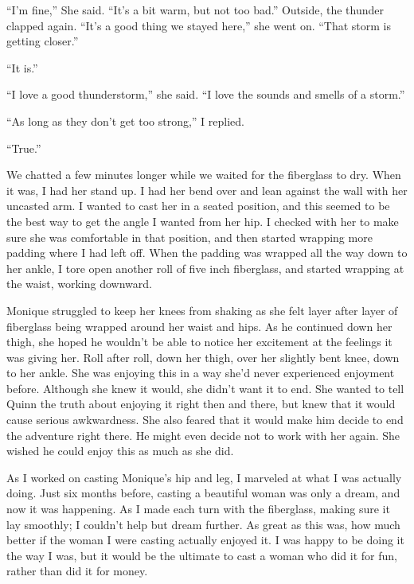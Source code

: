 ``I'm fine,'' She said. ``It's a bit warm, but not too bad.'' Outside, the thunder clapped
again. ``It's a good thing we stayed here,'' she went on. ``That storm is getting closer.''

``It is.''

``I love a good thunderstorm,'' she said. ``I love the sounds and smells of a storm.''

``As long as they don't get too strong,'' I replied.

``True.''

We chatted a few minutes longer while we waited for the fiberglass to dry. When it was, I
had her stand up. I had her bend over and lean against the wall with her uncasted arm. I wanted
to cast her in a seated position, and this seemed to be the best way to get the angle I wanted
from her hip. I checked with her to make sure she was comfortable in that position, and then
started wrapping more padding where I had left off. When the padding was wrapped all the way
down to her ankle, I tore open another roll of five inch fiberglass, and started wrapping at the
waist, working downward.

\begin{thought}
Monique struggled to keep her knees from shaking as she felt layer after layer of
fiberglass being wrapped around her waist and hips. As he continued down her thigh, she hoped he
wouldn't be able to notice her excitement at the feelings it was giving her. Roll after roll,
down her thigh, over her slightly bent knee, down to her ankle. She was enjoying this in a way
she'd never experienced enjoyment before. Although she knew it would, she didn't want it to end.
She wanted to tell Quinn the truth about enjoying it right then and there, but knew that it
would cause serious awkwardness. She also feared that it would make him decide to end the
adventure right there. He might even decide not to work with her again. She wished he could
enjoy this as much as she did.
\end{thought}

As I worked on casting Monique's hip and leg, I marveled at what I was actually doing.
Just six months before, casting a beautiful woman was only a dream, and now it was happening. As
I made each turn with the fiberglass, making sure it lay smoothly; I couldn't help but dream
further. As great as this was, how much better if the woman I were casting actually enjoyed it.
I was happy to be doing it the way I was, but it would be the ultimate to cast a woman who did
it for fun, rather than did it for money.

